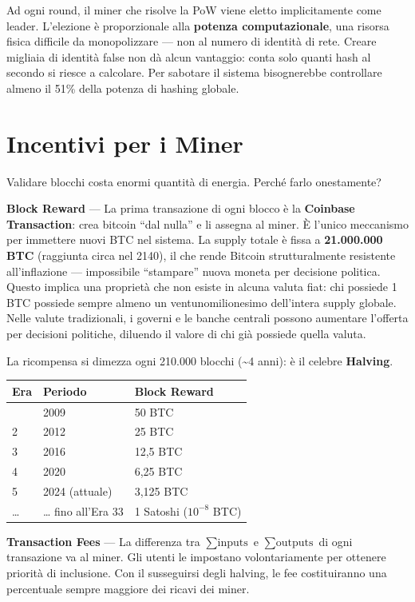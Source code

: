 \documentclass[
  italian,
  openany]{book}
\newcounter{none} %
\begin{document}
Ad ogni round, il miner che risolve la PoW viene eletto implicitamente
come leader. L'elezione è proporzionale alla \textbf{potenza
computazionale}, una risorsa fisica difficile da monopolizzare --- non
al numero di identità di rete. Creare migliaia di identità false non dà
alcun vantaggio: conta solo quanti hash al secondo si riesce a
calcolare. Per sabotare il sistema bisognerebbe controllare almeno il
51\% della potenza di hashing globale.

\section{Incentivi per i Miner}\label{incentivi-per-i-miner}

Validare blocchi costa enormi quantità di energia. Perché farlo
onestamente?

\textbf{Block Reward} --- La prima transazione di ogni blocco è la
\textbf{Coinbase Transaction}: crea bitcoin ``dal nulla'' e li assegna
al miner. È l'unico meccanismo per immettere nuovi BTC nel sistema. La
supply totale è fissa a \textbf{21.000.000 BTC} (raggiunta circa nel
2140), il che rende Bitcoin strutturalmente resistente all'inflazione
--- impossibile ``stampare'' nuova moneta per decisione politica. Questo
implica una proprietà che non esiste in alcuna valuta fiat: chi possiede
1 BTC possiede sempre almeno un ventunomilionesimo dell'intera supply
globale. Nelle valute tradizionali, i governi e le banche centrali
possono aumentare l'offerta per decisioni politiche, diluendo il valore
di chi già possiede quella valuta.

La ricompensa si dimezza ogni 210.000 blocchi (\textasciitilde4 anni): è
il celebre \textbf{Halving}.

{\def\LTcaptype{none} %
\begin{longtable}[]{@{}lll@{}}
\toprule\noalign{}
Era & Periodo & Block Reward \\
\midrule\noalign{}
\endhead
\bottomrule\noalign{}
\endlastfoot
1 & 2009 & 50 BTC \\
2 & 2012 & 25 BTC \\
3 & 2016 & 12,5 BTC \\
4 & 2020 & 6,25 BTC \\
5 & 2024 (attuale) & 3,125 BTC \\
\ldots{} & \ldots{} fino all'Era 33 & 1 Satoshi (\(10^{-8}\) BTC) \\
\end{longtable}
}

\textbf{Transaction Fees} --- La differenza tra \(\sum \text{inputs}\) e
\(\sum \text{outputs}\) di ogni transazione va al miner. Gli utenti le
impostano volontariamente per ottenere priorità di inclusione. Con il
susseguirsi degli halving, le fee costituiranno una percentuale sempre
maggiore dei ricavi dei miner.
\end{document}
